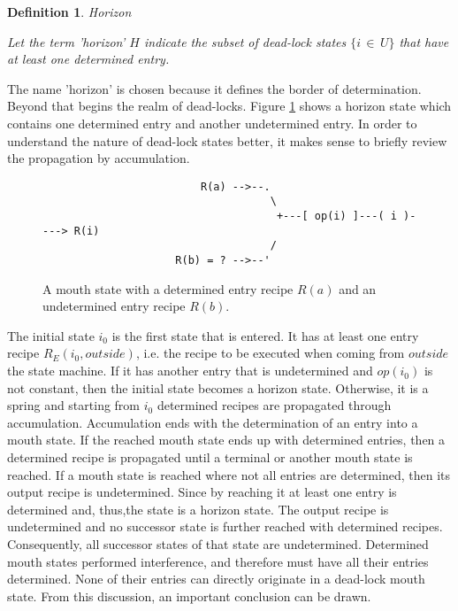 \documentclass[12pt,a4paper]{scrartcl}
\newtheorem{definition}{Definition}
\begin{document}
\begin{definition}
Horizon

Let the term 'horizon' $H$ indicate the subset of dead-lock states $\{
i\,\in\,U \}$ that have at least one determined entry.  
\end{definition}

The name 'horizon' is chosen because it defines the border of determination.
Beyond that begins the realm of dead-locks. Figure \ref{fig:horizon-state}
shows a horizon state which contains one determined entry and another
undetermined entry.  In order to understand the nature of dead-lock states
better, it makes sense to briefly review the propagation by accumulation.

\begin{figure}[htbp] \leavevmode \label{fig:horizon-state}
\begin{verbatim}
                         R(a) -->--.
                                    \
                                     +---[ op(i) ]---( i )----> R(i)
                                    /
                     R(b) = ? -->--'

\end{verbatim}
\caption{A mouth state with a determined entry recipe $R(a)$ and 
an undetermined entry recipe $R(b)$.}
\end{figure}

The initial state $i_0$ is the first state that is entered. It has at least one
entry recipe $R_E(i_0,outside)$, i.e. the recipe to be executed when coming
from $outside$ the state machine. If it has another entry that is undetermined
and $op(i_0)$ is not constant, then the initial state becomes a horizon state.
Otherwise, it is a spring and starting from $i_0$ determined recipes are
propagated through accumulation.  Accumulation ends with the determination of
an entry into a mouth state. If the reached mouth state ends up with determined
entries, then a determined recipe is propagated until a terminal or another
mouth state is reached. If a mouth state is reached where not all entries are
determined, then its output recipe is undetermined. Since by reaching it at
least one entry is determined and, thus,the state is a horizon state. The
output recipe is undetermined and no successor state is further reached with
determined recipes. Consequently, all successor states of that state are
undetermined.  Determined mouth states performed interference, and therefore
must have all their entries determined.  None of their entries can directly
originate in a dead-lock mouth state. From this discussion, an important
conclusion can be drawn.  
\end{document}
